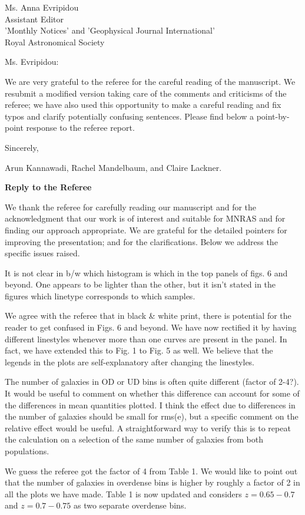 \documentclass[english]{letter}
\begin{document}
\date{\today}


\begin{letter}{Ms. Anna Evripidou\\ Assistant Editor\\ 'Monthly Notices' and 'Geophysical Journal International' \\
Royal Astronomical Society}

\opening{Ms. Evripidou:}

We are very grateful to the referee for the careful reading of the manuscript.
We resubmit a modified version taking care of the comments and criticisms of the referee; we have also
used this opportunity to make a careful reading and fix typos and clarify potentially confusing sentences. 
Please find below a point-by-point response to the referee report.

\closing{Sincerely,}
Arun Kannawadi, Rachel Mandelbaum, and Claire Lackner.
\end{letter}
\vspace{20pt}
{\bf Reply to the Referee}

We thank the referee for carefully reading our manuscript and for the acknowledgment that our work is of interest
and suitable for MNRAS and for finding our approach appropriate. We are grateful for the detailed pointers for improving the presentation; and for the clarifications. Below we address the specific issues raised.

\begin{shaded}
It is not clear in b/w which histogram is which in the top panels of figs. 6 and beyond. One appears to be lighter than the other, but it isn't stated in the figures which linetype corresponds to which samples.
\end{shaded}
\noindent
We agree with the referee that in black \& white print, there is potential for the reader to get confused in Figs. 6
and beyond. We have now rectified it by having different linestyles whenever more than one curves are present in the panel. In fact, we have extended this to Fig. 1 to Fig. 5 as well. We believe that the legends in the plots are self-explanatory after changing the linestyles.

\begin{shaded}
The number of galaxies in OD or UD bins is often quite different (factor of 2-4?). It would be useful to comment on whether this difference can account for some of the differences in mean quantities plotted. I think the effect due to differences in the number of galaxies should be small for rms(e), but a specific comment on the relative effect would be useful. A straightforward way to verify this is to repeat the calculation on a selection of the same number of galaxies from both populations.
\end{shaded}
\noindent 
We guess the referee got the factor of 4 from Table 1. We would like to point out that the number of galaxies in overdense bins is higher by roughly a factor of 2 in all the plots we have made. Table 1 is now updated and considers $z=0.65-0.7$ and $z=0.7-0.75$ as two separate overdense bins. 
\end{document}
